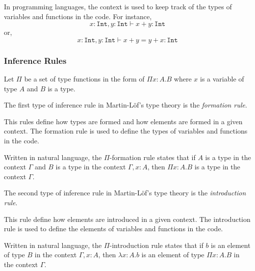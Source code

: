 In programming languages, the context is used to keep track of the types of variables and functions in the code. For instance,
$$
x : \texttt{Int}, y : \texttt{Int} \vdash x + y : \texttt{Int}
$$
or,
$$
x : \texttt{Int}, y : \texttt{Int} \vdash x + y = y + x : \texttt{Int}
$$

\subsubsection{Inference Rules}\label{subsubsec:background:InferenceRules}
Let $\Pi$ be a set of type functions in the form of $\Pi x : A. B$ where $x$ is a variable of type $A$ and $B$ is a type.

The first type of inference rule in Martin-L\"of's type theory is the \textit{formation rule}.
\begin{tcolorbox}[myboxstyle=black, title=Formation Rule]
     This rules define how types are formed and how elements are formed in a given context. The formation rule is used to define the types of variables and functions in the code.
    \begin{prooftree}
    \end{prooftree}
    \tcblower
    Written in natural language, the $\Pi$-formation rule states that if $A$ is a type in the context $\Gamma$ and $B$ is a type in the context $\Gamma, x : A$, then $\Pi x : A. B$ is a type in the context $\Gamma$.
\end{tcolorbox}

The second type of inference rule in Martin-L\"of's type theory is the \textit{introduction rule}.
\begin{tcolorbox}[myboxstyle=black, title=Introduction Rule]
    This rule define how elements are introduced in a given context. The introduction rule is used to define the elements of variables and functions in the code.
    \begin{prooftree}
    \end{prooftree}
    \tcblower
    Written in natural language, the $\Pi$-introduction rule states that if $b$ is an element of type $B$ in the context $\Gamma, x : A$, then $\lambda x : A. b$ is an element of type $\Pi x : A. B$ in the context $\Gamma$.
\end{tcolorbox}


